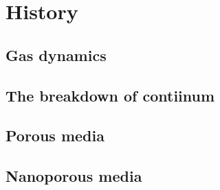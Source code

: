 \section{History}

\subsection{Gas dynamics}
\subsection{The breakdown of contiinum}
\subsection{Porous media}
\subsection{Nanoporous media}